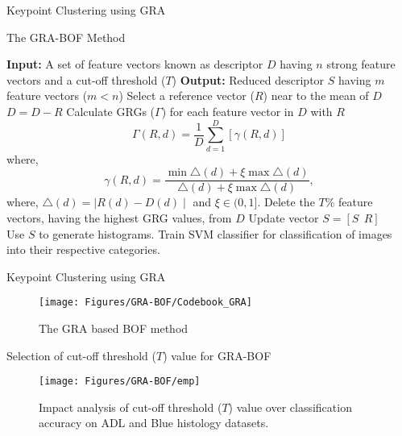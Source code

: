 \documentclass [9pt,times] {beamer}
\begin{document}
\begin{frame}{Keypoint Clustering using GRA}\label{KGRA1}
\begin{block}{The GRA-BOF Method}
	\begin{algorithm}[H]
		\scriptsize
		\label{algo:KSGRA}
		\begin{algorithmic}[1]
			\STATE \textbf{Input:}  A set of feature vectors known as descriptor $D$ having $n$  strong feature vectors and a cut-off threshold ($T$)  
			\STATE \textbf{Output:}  Reduced descriptor $S$ having $m$ feature vectors ($m<n$)
			\STATE Select a reference vector ($R$) near to the mean of $D$
			\STATE $D= D- R$
			\STATE Calculate GRGs ($\Gamma$) for each feature vector in $D$ with $R$
					\begin{equation*} \label{eq:grg}
				\Gamma(R, d)= \frac{1}{D}\sum_{d=1}^D[\gamma(R, d)]
			\end{equation*} 
			where, \begin{equation*} \label{eq:grc}
				\gamma(R, d)=\frac{ \min \limits  \triangle(d) + \xi \max \limits \triangle(d) }{\triangle(d)+\xi \max\limits \triangle(d)}, 
	\end{equation*}
	where, $ \triangle(d)= \mid R(d) - D(d) \mid$ and $\xi \in (0,1]$. 
			\STATE Delete the $T\%$ feature vectors, having the highest GRG values, from $D$
			\STATE Update vector $S=[S\ \ R]$ 
			\ENDWHILE \\
			\STATE Use $S$ to generate histograms.
			\STATE Train SVM classifier for classification of images into their respective categories.
		\end{algorithmic}
	\end{algorithm}
\end{block}

\end{frame}


\begin{frame}{Keypoint Clustering using GRA}
\begin{figure}[ht]
	\centering
	\texttt{[image: Figures/GRA-BOF/Codebook\_GRA]}
	\caption{\scriptsize The GRA based BOF method}
	\label{fig:grabof}
\end{figure}
\end{frame}



\begin{frame}{Selection of cut-off threshold ($T$) value for GRA-BOF}
\begin{figure}[ht]
	\centering
	\texttt{[image: Figures/GRA-BOF/emp]}
	\caption{\scriptsize Impact analysis of cut-off threshold ($T$) value over classification accuracy on ADL and Blue histology datasets.}
	\label{fig:T3}
\end{figure}
\end{frame}
\end{document}
